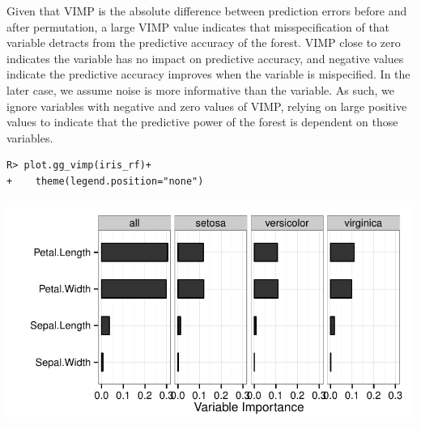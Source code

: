 \documentclass[nojss]{jss}\usepackage[]{graphicx}\usepackage[]{color}
\makeatletter
\def\maxwidth{ %
  \ifdim\Gin@nat@width>\linewidth
    \linewidth
  \else
    \Gin@nat@width
  \fi
}
\newenvironment{kframe}{%
 \def\at@end@of@kframe{}%
 \ifinner\ifhmode%
  \def\at@end@of@kframe{\end{minipage}}%
  \begin{minipage}{\columnwidth}%
 \fi\fi%
 \def\FrameCommand##1{\hskip\@totalleftmargin \hskip-\fboxsep
 \colorbox{shadecolor}{##1}\hskip-\fboxsep
     \hskip-\linewidth \hskip-\@totalleftmargin \hskip\columnwidth}%
 \MakeFramed {\advance\hsize-\width
   \@totalleftmargin\z@ \linewidth\hsize
   \@setminipage}}%
 {\par\unskip\endMakeFramed%
 \at@end@of@kframe}
\newenvironment{knitrout}{}{} %
\makeatother
\begin{document}
Given that VIMP is the absolute difference between prediction errors before and after permutation, a large VIMP value indicates that misspecification of that variable detracts from the predictive accuracy of the forest. VIMP close to zero indicates the variable has no impact on predictive accuracy, and negative values indicate the predictive accuracy improves when the variable is mispecified. In the later case, we assume noise is more informative than the variable. As such, we ignore variables with negative and zero values of VIMP, relying on large positive values to indicate that the predictive power of the forest is dependent on those variables. 
\begin{knitrout}\footnotesize
{}\color{fgcolor}\begin{kframe}
\begin{verbatim}
R> plot.gg_vimp(iris_rf)+
+    theme(legend.position="none")
\end{verbatim}
\end{kframe}

{\centering \includegraphics[width=\maxwidth]{figure/vig-iris-vimp-1} 

}



\end{knitrout}
\end{document}
